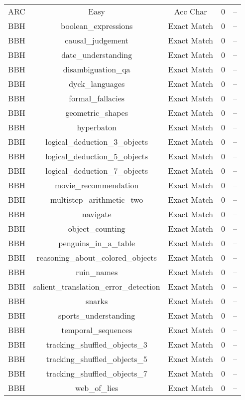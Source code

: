 \begin{longtable}{|c|c|c|c|c|}
    ARC & Easy & Acc Char & 0 & -- \\
    BBH & boolean\_expressions & Exact Match & 0 & -- \\
    BBH & causal\_judgement & Exact Match & 0 & -- \\
    BBH & date\_understanding & Exact Match & 0 & -- \\
    BBH & disambiguation\_qa & Exact Match & 0 & -- \\
    BBH & dyck\_languages & Exact Match & 0 & -- \\
    BBH & formal\_fallacies & Exact Match & 0 & -- \\
    BBH & geometric\_shapes & Exact Match & 0 & -- \\
    BBH & hyperbaton & Exact Match & 0 & -- \\
    BBH & logical\_deduction\_3\_objects & Exact Match & 0 & -- \\
    BBH & logical\_deduction\_5\_objects & Exact Match & 0 & -- \\
    BBH & logical\_deduction\_7\_objects & Exact Match & 0 & -- \\
    BBH & movie\_recommendation & Exact Match & 0 & -- \\
    BBH & multistep\_arithmetic\_two & Exact Match & 0 & -- \\
    BBH & navigate & Exact Match & 0 & -- \\
    BBH & object\_counting & Exact Match & 0 & -- \\
    BBH & penguins\_in\_a\_table & Exact Match & 0 & -- \\
    BBH & reasoning\_about\_colored\_objects & Exact Match & 0 & -- \\
    BBH & ruin\_names & Exact Match & 0 & -- \\
    BBH & salient\_translation\_error\_detection & Exact Match & 0 & -- \\
    BBH & snarks & Exact Match & 0 & -- \\
    BBH & sports\_understanding & Exact Match & 0 & -- \\
    BBH & temporal\_sequences & Exact Match & 0 & -- \\
    BBH & tracking\_shuffled\_objects\_3 & Exact Match & 0 & -- \\
    BBH & tracking\_shuffled\_objects\_5 & Exact Match & 0 & -- \\
    BBH & tracking\_shuffled\_objects\_7 & Exact Match & 0 & -- \\
    BBH & web\_of\_lies & Exact Match & 0 & -- \\

\end{longtable}
